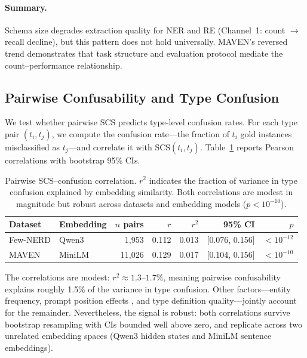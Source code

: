 \paragraph{Summary.}
Schema size degrades extraction quality for NER and RE (Channel~1: count $\to$ recall decline), but this pattern does not hold universally. MAVEN's reversed trend demonstrates that task structure and evaluation protocol mediate the count--performance relationship.

\subsection{Pairwise Confusability and Type Confusion}
\label{sec:pairwise}

We test whether pairwise SCS predicts type-level confusion rates. For each type pair $(t_i, t_j)$, we compute the confusion rate---the fraction of $t_i$ gold instances misclassified as $t_j$---and correlate it with $\text{SCS}(t_i, t_j)$. Table~\ref{tab:pairwise} reports Pearson correlations with bootstrap 95\% CIs.

\begin{table}[t]
\centering
\small
\begin{tabular}{llrrrrr}
\toprule
\textbf{Dataset} & \textbf{Embedding} & \textbf{$n$ pairs} & \textbf{$r$} & \textbf{$r^2$} & \textbf{95\% CI} & \textbf{$p$} \\
\midrule
Few-NERD & Qwen3 & 1{,}953 & 0.112 & 0.013 & {[}0.076, 0.156{]} & ${<}10^{-12}$ \\
MAVEN & MiniLM & 11{,}026 & 0.129 & 0.017 & {[}0.104, 0.156{]} & ${<}10^{-10}$ \\
\bottomrule
\end{tabular}
\caption{Pairwise SCS--confusion correlation. $r^2$ indicates the fraction of variance in type confusion explained by embedding similarity. Both correlations are modest in magnitude but robust across datasets and embedding models ($p < 10^{-10}$).}
\label{tab:pairwise}
\end{table}

The correlations are modest: $r^2 \approx 1.3\text{--}1.7\%$, meaning pairwise confusability explains roughly 1.5\% of the variance in type confusion. Other factors---entity frequency, prompt position effects \cite{lost-in-middle-2024}, and type definition quality---jointly account for the remainder. Nevertheless, the signal is robust: both correlations survive bootstrap resampling with CIs bounded well above zero, and replicate across two unrelated embedding spaces (Qwen3 hidden states and MiniLM sentence embeddings).

